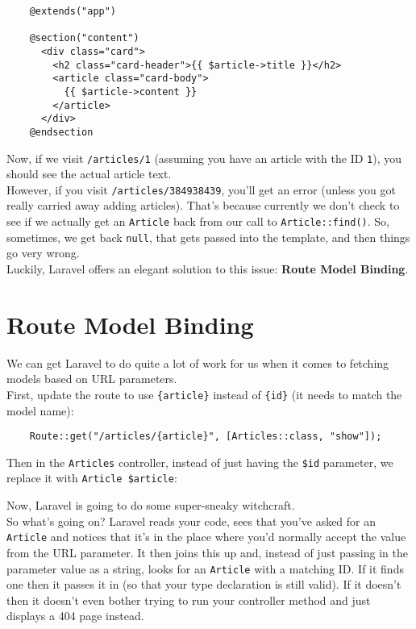 \begin{verbatim}
    @extends("app")

    @section("content")
      <div class="card">
        <h2 class="card-header">{{ $article->title }}</h2>
        <article class="card-body">
          {{ $article->content }}
        </article>
      </div>
    @endsection
\end{verbatim}

Now, if we visit \texttt{/articles/1} (assuming you have an article with the ID \texttt{1}), you should see the actual article text.
\\

However, if you visit \texttt{/articles/384938439}, you'll get an error (unless you got really carried away adding articles). That's because currently we don't check to see if we actually get an \texttt{Article} back from our call to \texttt{Article::find()}. So, sometimes, we get back \texttt{null}, that gets passed into the template, and then things go very wrong.
\\

Luckily, Laravel offers an elegant solution to this issue: \textbf{Route Model Binding}.


\section{Route Model Binding}

We can get Laravel to do quite a lot of work for us when it comes to fetching models based on URL parameters.
\\

First, update the route to use \texttt{\{article\}} instead of \texttt{\{id\}} (it needs to match the model name):

\begin{verbatim}
    Route::get("/articles/{article}", [Articles::class, "show"]);
\end{verbatim}

Then in the \texttt{Articles} controller, instead of just having the \texttt{\$id} parameter, we replace it with \texttt{Article \$article}:


Now, Laravel is going to do some super-sneaky witchcraft.
\\

So what's going on? Laravel reads your code, sees that you've asked for an \texttt{Article} and notices that it's in the place where you'd normally accept the value from the URL parameter. It then joins this up and, instead of just passing in the parameter value as a string, looks for an \texttt{Article} with a matching ID. If it finds one then it passes it in (so that your type declaration is still valid). If it doesn't then it doesn't even bother trying to run your controller method and just displays a 404 page instead.
\\

